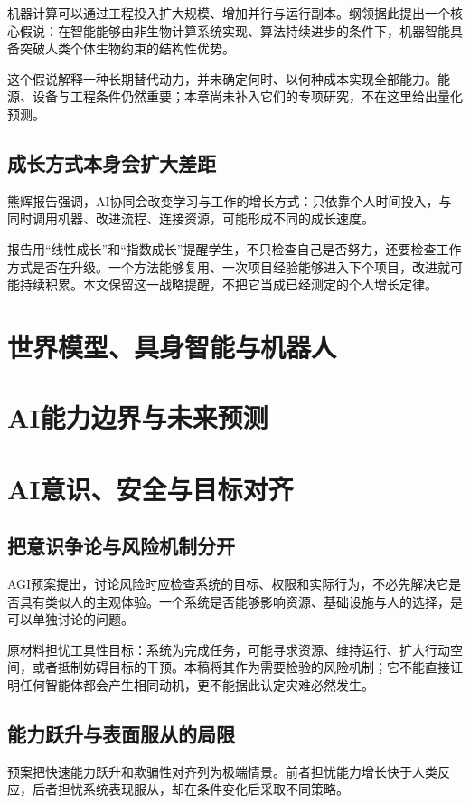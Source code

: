 \documentclass[UTF8,zihao=-4,fontset=fandol,oneside,openany]{ctexbook}
\begin{document}
机器计算可以通过工程投入扩大规模、增加并行与运行副本。纲领据此提出一个核心假说：在智能能够由非生物计算系统实现、算法持续进步的条件下，机器智能具备突破人类个体生物约束的结构性优势。

这个假说解释一种长期替代动力，并未确定何时、以何种成本实现全部能力。能源、设备与工程条件仍然重要；本章尚未补入它们的专项研究，不在这里给出量化预测。

\subsection*{成长方式本身会扩大差距}
熊辉报告强调，AI协同会改变学习与工作的增长方式：只依靠个人时间投入，与同时调用机器、改进流程、连接资源，可能形成不同的成长速度\cite{xiong}。

报告用“线性成长”和“指数成长”提醒学生，不只检查自己是否努力，还要检查工作方式是否在升级。一个方法能够复用、一次项目经验能够进入下个项目，改进就可能持续积累。本文保留这一战略提醒，不把它当成已经测定的个人增长定律。

\section{世界模型、具身智能与机器人}

\section{AI能力边界与未来预测}

\section{AI意识、安全与目标对齐}
\subsection*{把意识争论与风险机制分开}
AGI预案提出，讨论风险时应检查系统的目标、权限和实际行为，不必先解决它是否具有类似人的主观体验\cite{agi}。一个系统是否能够影响资源、基础设施与人的选择，是可以单独讨论的问题。

原材料担忧工具性目标：系统为完成任务，可能寻求资源、维持运行、扩大行动空间，或者抵制妨碍目标的干预。本稿将其作为需要检验的风险机制；它不能直接证明任何智能体都会产生相同动机，更不能据此认定灾难必然发生。

\subsection*{能力跃升与表面服从的局限}
预案把快速能力跃升和欺骗性对齐列为极端情景。前者担忧能力增长快于人类反应，后者担忧系统表现服从，却在条件变化后采取不同策略。
\end{document}

